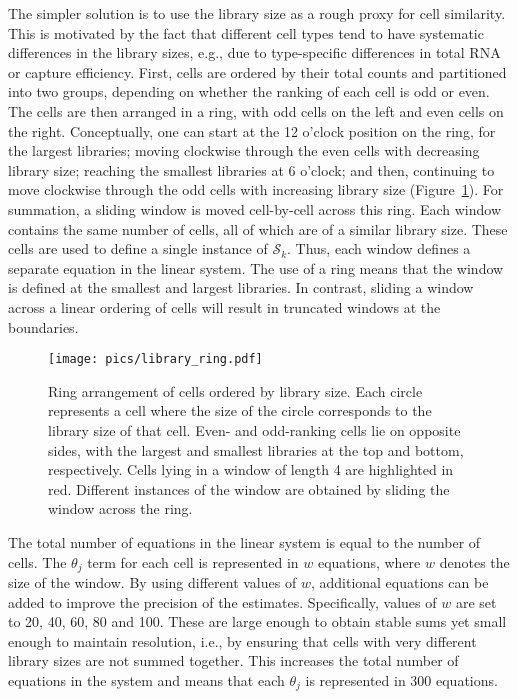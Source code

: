 \documentclass{article}
\begin{document}
The simpler solution is to use the library size as a rough proxy for cell similarity.
This is motivated by the fact that different cell types tend to have systematic differences in the library sizes, 
    e.g., due to type-specific differences in total RNA or capture efficiency.
First, cells are ordered by their total counts and partitioned into two groups, depending on whether the ranking of each cell is odd or even.
The cells are then arranged in a ring, with odd cells on the left and even cells on the right.
Conceptually, one can start at the 12 o'clock position on the ring, for the largest libraries; moving clockwise through the even cells with decreasing library size;
reaching the smallest libraries at 6 o'clock; and then, continuing to move clockwise through the odd cells with increasing library size (Figure~\ref{fig:library_ring}).
For summation, a sliding window is moved cell-by-cell across this ring.
Each window contains the same number of cells, all of which are of a similar library size.
These cells are used to define a single instance of $\mathcal{S}_{k}$.
Thus, each window defines a separate equation in the linear system.
The use of a ring means that the window is defined at the smallest and largest libraries.
In contrast, sliding a window across a linear ordering of cells will result in truncated windows at the boundaries.

\begin{figure}[bt]
    \begin{center}
        \texttt{[image: pics/library\_ring.pdf]}
    \end{center}
    \caption{
        Ring arrangement of cells ordered by library size.
        Each circle represents a cell where the size of the circle corresponds to the library size of that cell.
        Even- and odd-ranking cells lie on opposite sides, with the largest and smallest libraries at the top and bottom, respectively.
        Cells lying in a window of length 4 are highlighted in red.
        Different instances of the window are obtained by sliding the window across the ring.
    }
    \label{fig:library_ring}
\end{figure}

The total number of equations in the linear system is equal to the number of cells.
The $\theta_j$ term for each cell is represented in $w$ equations, where $w$ denotes the size of the window.
By using different values of $w$, additional equations can be added to improve the precision of the estimates. 
Specifically, values of $w$ are set to 20, 40, 60, 80 and 100.
These are large enough to obtain stable sums yet small enough to maintain resolution, i.e., by ensuring that cells with very different library sizes are not summed together.
This increases the total number of equations in the system and means that each $\theta_j$ is represented in 300 equations. 
\end{document}
